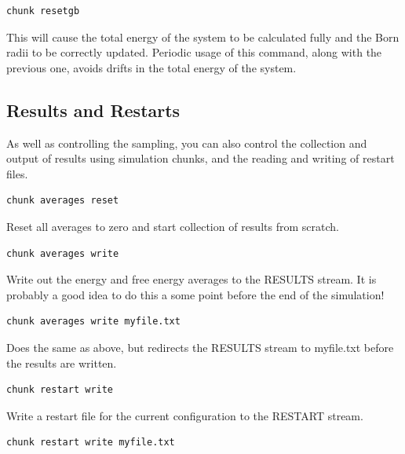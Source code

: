 \documentclass[letterpaper,10pt,english]{sphinxmanual}
\begin{document}
\begin{Verbatim}[commandchars=\\\{\}]
chunk resetgb
\end{Verbatim}

This will cause the total energy of the system to be calculated fully and the Born radii to be correctly updated. Periodic usage of this command, along with the previous one, avoids drifts in the total energy of the system.


\subsection{Results and Restarts}
\label{protoms:results-and-restarts}
As well as controlling the sampling, you can also control the collection and output of results using simulation chunks, and the reading and writing of restart files.

\begin{Verbatim}[commandchars=\\\{\}]
chunk averages reset
\end{Verbatim}

Reset all averages to zero and start collection of results from scratch.

\begin{Verbatim}[commandchars=\\\{\}]
chunk averages write
\end{Verbatim}

Write out the energy and free energy averages to the RESULTS stream. It is probably a good idea to do this a some point before the end of the simulation!

\begin{Verbatim}[commandchars=\\\{\}]
chunk averages write myfile.txt
\end{Verbatim}

Does the same as above, but redirects the RESULTS stream to myfile.txt before the results are written.

\begin{Verbatim}[commandchars=\\\{\}]
chunk restart write
\end{Verbatim}

Write a restart file for the current configuration to the RESTART stream.

\begin{Verbatim}[commandchars=\\\{\}]
chunk restart write myfile.txt
\end{Verbatim}
\end{document}
